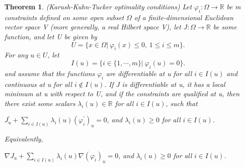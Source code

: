 \documentclass[a4paper]{report}
\newtheorem{theorem}{Theorem}[section]
\begin{document}
\begin{theorem}
    (Karush-Kuhn-Tucker optimality conditions) Let $\varphi_i:\Omega\to \mathbb R$ be m constraints defined on some open subset $\Omega$ of a finite-dimensional Euclidean vector space V (more generally, a real Hilbert space V), let $J:\Omega\to \mathbb R$ be some function, and let U be given by
    \[
        U=\{x\in\Omega|\ \varphi_i(x)\leq0, \ 1\leq i\leq m\}.
    \]
    For any $u\in U$, let 
    \[
        I(u)=\{i\in\{1,\cdots,m\}|\ \varphi_i(u)=0\}.
    \]
    and assume that the functions $\varphi_i$ are differentiable at u for all $i\in I(u)$ and continuous at u for all $i\notin I(u)$. If J is differentiable at u, it has a local minimum at u with respect to U, and if the constraints are qualified at u, then there exist some scalars $\lambda_i(u)\in\mathbb R$ for all $i\in I(u)$, such that
    \begin{center}
        $J^\prime_u+\sum\limits_{i\in I(u)} \lambda_i(u)(\varphi^\prime_i)_u=0$, and $\lambda_i(u)\geq0$ for all $i\in I(u)$.
    \end{center}
    Equivalently, 
    \begin{center}
        $\nabla J_u+\sum\limits_{i\in I(u)} \lambda_i(u)\nabla(\varphi_i)_u=0$, and $\lambda_i(u)\geq0$ for all $i\in I(u)$.
    \end{center}
\end{theorem}
\end{document}
